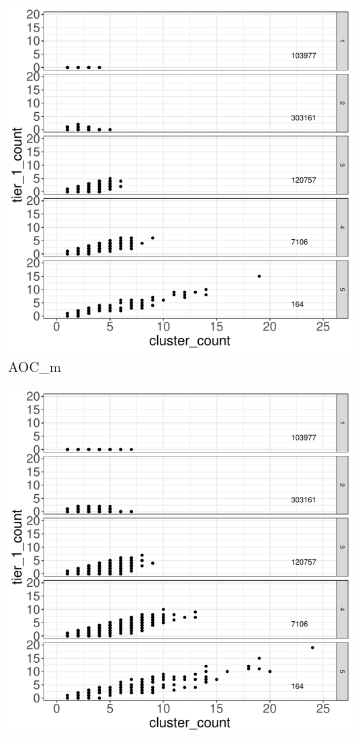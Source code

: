 \documentclass[12pt, oneside]{article}   	%
\begin{document}
\begin{figure}[H]
	\centering
	\begin{subfigure}[t]{0.48\textwidth}
	 \centering
	 \includegraphics[width=\linewidth]{tiervclustercount_m_opt.pdf} 
	 \caption{AOC\_m } \label{fig:2a}
	 \end{subfigure}
 \hfill
	\begin{subfigure}[t]{0.48\textwidth}
        \centering
        \includegraphics[width=\linewidth]{tiervclustercount_k_opt.pdf} 

\end{subfigure}
\end{figure}
\end{document}
